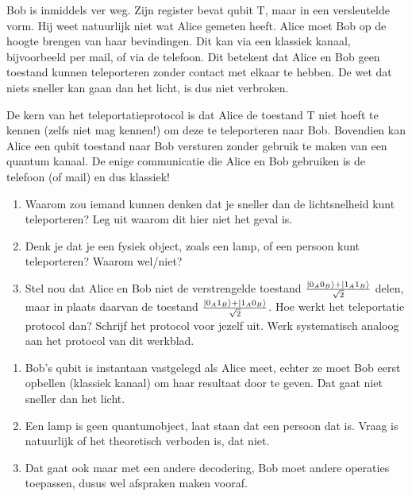 \documentclass[../../main.tex]{subfiles}
\begin{document}
Bob is inmiddels ver weg. Zijn register bevat qubit T, maar in een versleutelde vorm. Hij weet natuurlijk niet wat Alice gemeten heeft. Alice moet Bob op de hoogte brengen van haar bevindingen. Dit kan via een klassiek kanaal, bijvoorbeeld per mail, of via de telefoon. Dit betekent dat Alice en Bob geen toestand kunnen teleporteren zonder contact met elkaar te hebben. De wet dat niets sneller kan gaan dan het licht, is dus niet verbroken.

De kern van het teleportatieprotocol is dat Alice de toestand T niet hoeft te kennen (zelfs niet mag kennen!) om deze te teleporteren naar Bob. Bovendien kan Alice een qubit toestand naar Bob versturen zonder gebruik te maken van een quantum kanaal. De enige communicatie die Alice en Bob gebruiken is de telefoon (of mail) en dus klassiek!

\medskip
\begin{enumerate}[resume]
\item Waarom zou iemand kunnen denken dat je sneller dan de lichtsnelheid kunt teleporteren? Leg uit waarom dit hier niet het geval is.
\item Denk je dat je een fysiek object, zoals een lamp, of een persoon kunt teleporteren? Waarom wel/niet?
\item Stel nou dat Alice en Bob niet de verstrengelde toestand $\frac{\ket{0_A0_B}+\ket{1_A1_B}}{\sqrt{2}}$ delen, maar in plaats daarvan de toestand $\frac{\ket{0_A1_B}+\ket{1_A0_B}}{\sqrt{2}}$. Hoe werkt het teleportatie protocol dan? Schrijf het protocol voor jezelf uit. Werk systematisch analoog aan het protocol van dit werkblad.
\end{enumerate}
\begin{antwoord}[-10cm]
\begin{enumerate}[start=9, wide, labelwidth=!, labelindent=0pt]

\item Bob's qubit is instantaan vastgelegd als Alice meet, echter ze moet Bob eerst opbellen (klassiek kanaal) om haar resultaat door te geven. Dat gaat niet sneller dan het licht.
\item Een lamp is geen quantumobject,  laat staan dat een persoon dat is.  Vraag is natuurlijk of het theoretisch verboden is, dat niet.
\item Dat gaat ook maar met een andere decodering, Bob moet andere operaties toepassen, dusus wel afspraken maken vooraf.
\end{enumerate}
\end{antwoord}
\end{document}
